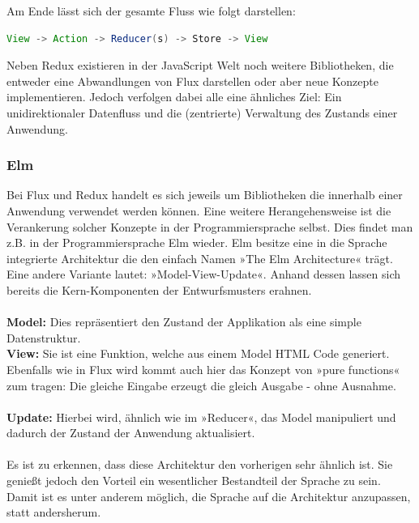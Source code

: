 Am Ende lässt sich der gesamte Fluss wie folgt darstellen:
\\
\begin{lstlisting}[frame=single, language=Java]
View -> Action -> Reducer(s) -> Store -> View
\end{lstlisting}
\bigskip
Neben Redux existieren in der JavaScript Welt noch weitere Bibliotheken, die entweder eine Abwandlungen von Flux darstellen oder aber neue Konzepte implementieren. Jedoch verfolgen dabei alle eine ähnliches Ziel: Ein unidirektionaler Datenfluss und die (zentrierte) Verwaltung des Zustands einer Anwendung.

\subsubsection{Elm}
Bei Flux und Redux handelt es sich jeweils um Bibliotheken die innerhalb einer Anwendung verwendet werden können. Eine weitere Herangehensweise ist die Verankerung solcher Konzepte in der Programmiersprache selbst. Dies findet man z.B. in
der Programmiersprache Elm
\cite{elmIntroduction}
wieder. Elm besitze eine in die Sprache integrierte Architektur die den einfach Namen »The Elm Architecture« 
\cite{theElmArchitecture}
trägt. Eine andere Variante lautet: »Model-View-Update«. Anhand dessen lassen sich bereits die Kern-Komponenten der Entwurfsmusters erahnen.
\\\\
\textbf{Model:} Dies repräsentiert den Zustand der Applikation als eine simple Datenstruktur.
\\
\textbf{View:} Sie ist eine Funktion, welche aus einem Model HTML Code generiert. Ebenfalls wie in Flux wird kommt auch hier das Konzept von »pure functions« zum tragen: Die gleiche Eingabe erzeugt die gleich Ausgabe - ohne Ausnahme.
\\\\
\textbf{Update:}
Hierbei wird, ähnlich wie im »Reducer«, das Model manipuliert und dadurch der Zustand der Anwendung aktualisiert.
\\\\
Es ist zu erkennen, dass diese Architektur den vorherigen sehr ähnlich ist. Sie genießt jedoch den Vorteil ein wesentlicher Bestandteil der Sprache zu sein. Damit ist es unter anderem möglich, die Sprache auf die Architektur anzupassen, statt andersherum.

